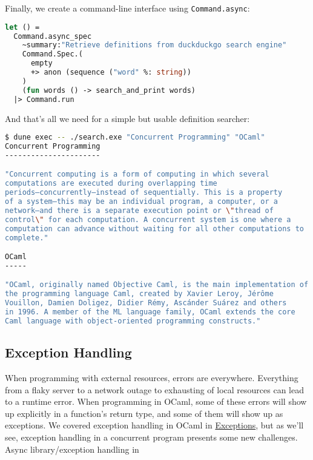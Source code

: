 Finally, we create a command-line interface using
\passthrough{\lstinline!Command.async!}:

\begin{lstlisting}[language=Caml]
let () =
  Command.async_spec
    ~summary:"Retrieve definitions from duckduckgo search engine"
    Command.Spec.(
      empty
      +> anon (sequence ("word" %: string))
    )
    (fun words () -> search_and_print words)
  |> Command.run
\end{lstlisting}

And that's all we need for a simple but usable definition searcher:~

\begin{lstlisting}[language=bash]
$ dune exec -- ./search.exe "Concurrent Programming" "OCaml"
Concurrent Programming
----------------------

"Concurrent computing is a form of computing in which several
computations are executed during overlapping time
periods—concurrently—instead of sequentially. This is a property
of a system—this may be an individual program, a computer, or a
network—and there is a separate execution point or \"thread of
control\" for each computation. A concurrent system is one where a
computation can advance without waiting for all other computations to
complete."

OCaml
-----

"OCaml, originally named Objective Caml, is the main implementation of
the programming language Caml, created by Xavier Leroy, Jérôme
Vouillon, Damien Doligez, Didier Rémy, Ascánder Suárez and others
in 1996. A member of the ML language family, OCaml extends the core
Caml language with object-oriented programming constructs."
\end{lstlisting}

\hypertarget{exception-handling}{%
\subsection{Exception Handling}\label{exception-handling}}

When programming with external resources, errors are everywhere.
Everything from a flaky server to a network outage to exhausting of
local resources can lead to a runtime error. When programming in OCaml,
some of these errors will show up explicitly in a function's return
type, and some of them will show up as exceptions. We covered exception
handling in OCaml in \href{error-handling.html\#exceptions}{Exceptions},
but as we'll see, exception handling in a concurrent program presents
some new challenges. \protect\hypertarget{ALexcept}{}{Async
library/exception handling in}

